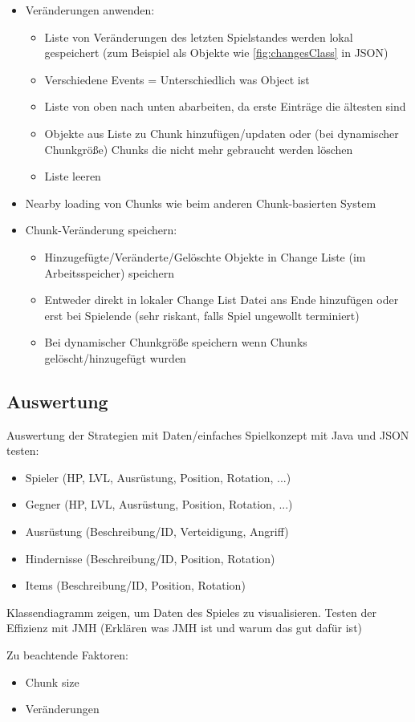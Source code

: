 \begin{itemize}
    \item Veränderungen anwenden:
    \begin{itemize}
        \item Liste von Veränderungen des letzten Spielstandes werden lokal gespeichert (zum Beispiel als Objekte wie \ref{fig:changesClass} in JSON)
        \item Verschiedene Events = Unterschiedlich was Object ist
        \item Liste von oben nach unten abarbeiten, da erste Einträge die ältesten sind 
        \item Objekte aus Liste zu Chunk hinzufügen/updaten oder (bei dynamischer Chunkgröße) Chunks die nicht mehr gebraucht werden löschen
        \item Liste leeren
    \end{itemize}
    \item Nearby loading von Chunks wie beim anderen Chunk-basierten System
    \item Chunk-Veränderung speichern:
    \begin{itemize}
        \item Hinzugefügte/Veränderte/Gelöschte Objekte in Change Liste (im Arbeitsspeicher) speichern
        \item Entweder direkt in lokaler Change List Datei ans Ende hinzufügen oder erst bei Spielende (sehr riskant, falls Spiel ungewollt terminiert)
        \item Bei dynamischer Chunkgröße speichern wenn Chunks gelöscht/hinzugefügt wurden
    \end{itemize}
\end{itemize}


\subsection{Auswertung}
Auswertung der Strategien mit Daten/einfaches Spielkonzept mit Java und JSON testen:
\begin{itemize}
    \item Spieler (HP, LVL, Ausrüstung, Position, Rotation, ...)
    \item Gegner (HP, LVL, Ausrüstung, Position, Rotation, ...)
    \item Ausrüstung (Beschreibung/ID, Verteidigung, Angriff)
    \item Hindernisse (Beschreibung/ID, Position, Rotation)
    \item Items (Beschreibung/ID, Position, Rotation)
\end{itemize}

Klassendiagramm zeigen, um Daten des Spieles zu visualisieren. Testen der Effizienz mit JMH (Erklären was JMH ist und warum das gut dafür ist)

Zu beachtende Faktoren:
\begin{itemize}
    \item Chunk size
    \item Veränderungen
\end{itemize}